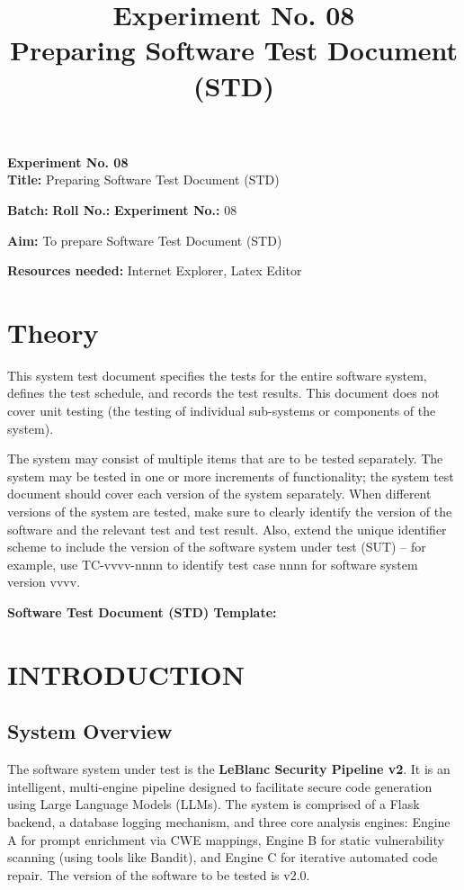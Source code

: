 \documentclass[12pt, a4paper]{article}
\title{\textbf{Experiment No. 08} \\ \large Preparing Software Test Document (STD)}
\author{}
\date{}
\begin{document}
\begin{center}
    \textbf{Experiment No. 08} \\
    \vspace{0.5cm}
    \textbf{Title:} Preparing Software Test Document (STD)
\end{center}

\vspace{0.5cm}
\noindent \textbf{Batch:} \hspace{2cm} \textbf{Roll No.:} \hspace{3cm} \textbf{Experiment No.:} 08

\vspace{0.5cm}
\noindent \textbf{Aim:} To prepare Software Test Document (STD)

\vspace{0.5cm}
\noindent \textbf{Resources needed:} Internet Explorer, Latex Editor

\hrulefill

\section*{Theory}
This system test document specifies the tests for the entire software system, defines the test schedule, and records the test results. This document does not cover unit testing (the testing of individual sub-systems or components of the system). 

The system may consist of multiple items that are to be tested separately. The system may be tested in one or more increments of functionality; the system test document should cover each version of the system separately. When different versions of the system are tested, make sure to clearly identify the version of the software and the relevant test and test result. Also, extend the unique identifier scheme to include the version of the software system under test (SUT) – for example, use TC-vvvv-nnnn to identify test case nnnn for software system version vvvv.

\vspace{0.5cm}
\begin{center}
    \textbf{Software Test Document (STD) Template:}
\end{center}

\section{INTRODUCTION}

\subsection{System Overview}
The software system under test is the \textbf{LeBlanc Security Pipeline v2}. It is an intelligent, multi-engine pipeline designed to facilitate secure code generation using Large Language Models (LLMs). The system is comprised of a Flask backend, a database logging mechanism, and three core analysis engines: Engine A for prompt enrichment via CWE mappings, Engine B for static vulnerability scanning (using tools like Bandit), and Engine C for iterative automated code repair. The version of the software to be tested is v2.0.
\end{document}
